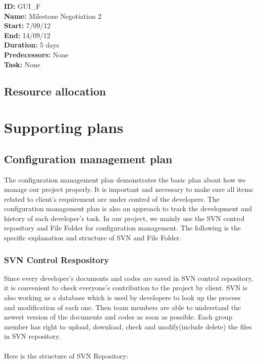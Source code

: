 \documentclass[11pt, a4paper]{report}
\begin{document}
\noindent \textbf{ID:} GUI_F \\
\noindent \textbf{Name:} Milestone Negotiation 2 \\
\noindent \textbf{Start:} 7/09/12 \\
\noindent \textbf{End:} 14/09/12 \\
\noindent \textbf{Duration:} 5 days \\
\noindent \textbf{Predecessors:} None \\
\noindent \textbf{Task:} None\\[0.5cm]




\section{Resource allocation}

\pagebreak


\chapter{Supporting plans}

\section{Configuration management plan}
The configuration management plan demonstrates the basic plan about how we manage our project properly. It is important and necessary to make sure all items related to client's requirement are under control of the developers. The configuration management plan is also an approach to track the development and history of each developer's task. In our project, we mainly use the SVN control repository and File Folder for configuration management. The following is the specific explanation and  structure of SVN and File Folder. \\
\subsection{SVN Control Respository}
Since every developer's documents and codes are saved in SVN control repository, it is convenient to check everyone's contribution to the project by client. SVN is also working as a database which is used by developers to look up the process and modification of each one. Then team members are able to understand the newest version of the documents and codes as soon as possible. Each group member has right to upload, download, check and modify(include delete) the files in SVN repository.\\
\\
Here is the structure of SVN Repository:
\end{document}
